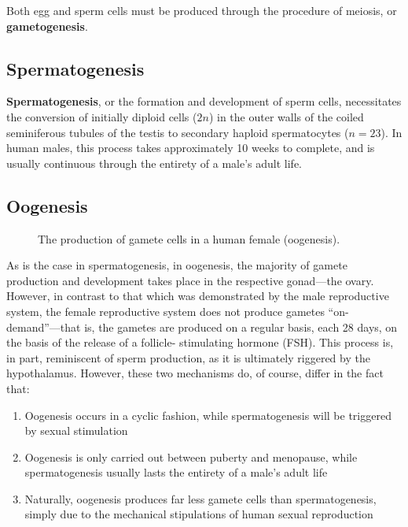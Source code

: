 \documentclass{article}
\begin{document}
Both egg and sperm cells must be produced through the procedure of meiosis, or
\textbf{gametogenesis}.

\subsection{Spermatogenesis}

\textbf{Spermatogenesis}, or the formation and development of sperm cells,
necessitates the conversion of initially diploid cells ($2n$) in the outer
walls of the coiled seminiferous tubules of the testis to secondary haploid
spermatocytes ($n = 23$). In human males, this process takes approximately
10 weeks to complete, and is usually continuous through the entirety of a
male's adult life.

\subsection{Oogenesis}

\begin{figure}
	\centering
	\caption{The production of gamete cells in a human female (oogenesis).}
\end{figure}

As is the case in spermatogenesis, in oogenesis, the majority of gamete
production and development takes place in the respective gonad---the
ovary. However, in contrast to that which was demonstrated by the male
reproductive system, the female reproductive system does not produce
gametes ``on-demand''---that is, the gametes are produced on a regular
basis, each 28 days, on the basis of the release of a follicle-
stimulating hormone (FSH). This process is, in part, reminiscent of
sperm production, as it is ultimately riggered by the hypothalamus.
However, these two mechanisms do, of course, differ in the fact that:

\begin{enumerate}
	\item Oogenesis occurs in a cyclic fashion, while spermatogenesis
		will be triggered by sexual stimulation
	\item Oogenesis is only carried out between puberty and menopause,
		while spermatogenesis usually lasts the entirety of a male's
		adult life
	\item Naturally, oogenesis produces far less gamete cells than
		spermatogenesis, simply due to the mechanical stipulations
		of human sexual reproduction
\end{enumerate}
\end{document}
